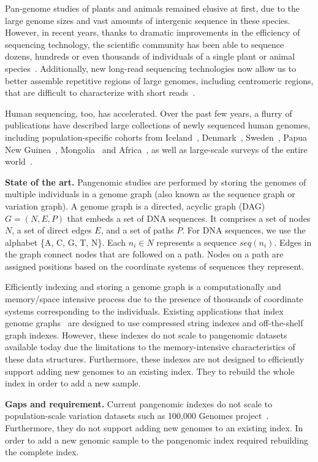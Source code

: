 Pan-genome studies of plants and animals remained elusive at first, due to the large genome sizes and vast amounts of intergenic sequence in these species. However, in recent years, thanks to dramatic improvements in the efficiency of sequencing technology, the scientific community has been able to sequence dozens, hundreds or even thousands of individuals of a single plant or animal species~\cite{XXX}. Additionally, new long-read sequencing technologies now allow us to better assemble repetitive regions of large genomes, including centromeric regions, that are difficult to characterize with short reads~\cite{XXX}.

Human sequencing, too, has accelerated. Over the past few years, a flurry of publications have described large collections of newly sequenced human genomes, including population-specific cohorts from Iceland~\cite{XXX}, Denmark~\cite{XXX}, Sweden~\cite{XXX}, Papua New Guinea~\cite{XXX}, Mongolia~\cite{XXX} and Africa~\cite{XXX}, as well as large-scale surveys of the entire world~\cite{XXX}.

\noindent
{\bf State of the art.}
Pangenomic studies are performed by storing the genomes of multiple individuals in a genome graph (also known as the sequence graph or variation graph). A genome graph is a directed, acyclic graph (DAG) $G = (N, E, P)$ that embeds a set of DNA sequences. It comprises a set of nodes $N$, a set of direct edges $E$, and a set of paths $P$. For DNA sequences, we use the alphabet \{A, C, G, T, N\}\@. Each $n_i \in N$ represents a sequence $seq(n_i)$. Edges in the graph connect nodes that are followed on a path. Nodes on a path are assigned positions based on the coordinate systems of sequences they represent.

Efficiently indexing and storing a genome graph is a computationally and memory/space intensive process due to the presence of thousands of coordinate systems corresponding to the individuals. Existing applications that index genome graphs~\cite{pandey2021variantstore,garrison2018variation} are designed to use compressed string indexes and off-the-shelf graph indexes. However, these indexes do not scale to pangenomic datasets available today due the limitations to the memory-intensive characteristics of these data structures. Furthermore, these indexes are not designed to efficiently support adding new genomes to an existing index. They to rebuild the whole index in order to add a new sample.

\noindent
{\bf Gaps and requirement.}
Current pangenomic indexes do not scale to population-scale variation datasets such as 100,000 Genomes project~\cite{1002021100}. Furthermore, they do not support adding new genomes to an existing index. In order to add a new genomic sample to the pangenomic index required rebuilding the complete index.

